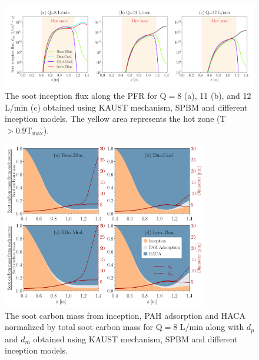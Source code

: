 \begin{figure}[H]
	\centering
	\includegraphics[width=1\textwidth]{Figures/Results/PFR/inception.pdf}
	\caption{The soot inception flux along the PFR for $\mathrm{Q}=8$ (a), 11 (b), and 12 L/min (c) obtained using KAUST mechanism, SPBM and different inception models. The yellow area represents the hot zone (T$>0.9\mathrm{T_{max}}$).}
	\label{fig:pfr_Iinc} 
\end{figure}


\begin{figure}[H]
	\centering
	\includegraphics[width=0.8\textwidth]{Figures/Results/PFR/C_tot_distmap.pdf}
	\caption{The soot carbon mass from inception, PAH adsorption and HACA normalized by total soot carbon mass for $\mathrm{Q}=8$ L/min along with $d_p$ and $d_m$ obtained using KAUST mechanism, SPBM and different inception models.}
	\label{fig:pfr_cmap} 
\end{figure}